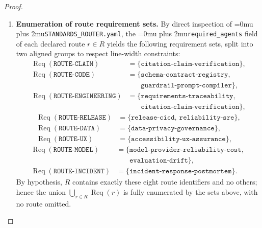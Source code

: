 \documentclass[12pt]{article}
\theoremstyle{definition}
\DeclareRobustCommand{\code}[1]{\begingroup\Urlmuskip=0mu plus 2mu\relax\nolinkurl{#1}\endgroup}
\begin{document}
\begin{proof}
\begin{enumerate}
      \item \textbf{Enumeration of route requirement sets.}
      By direct inspection of \code{STANDARDS\_ROUTER.yaml}, the
      \code{required\_agents} field of each declared route $r \in R$
      yields the following requirement sets, split into two aligned
      groups to respect line-width constraints:
      \begin{align*}
            \operatorname{Req}(\texttt{ROUTE-CLAIM})
                  &= \{\texttt{citation-claim-verification}\}, \\
            \operatorname{Req}(\texttt{ROUTE-CODE})
                  &= \{\texttt{schema-contract-registry},\ \\
                  &\phantom{{}=\{{}}\texttt{guardrail-prompt-compiler}\}, \\
            \operatorname{Req}(\texttt{ROUTE-ENGINEERING})
                  &= \{\texttt{requirements-traceability},\ \\
                  &\phantom{{}=\{{}}\texttt{citation-claim-verification}\},
      \end{align*}
      \begin{align*}
            \operatorname{Req}(\texttt{ROUTE-RELEASE})
                  &= \{\texttt{release-cicd},\ \texttt{reliability-sre}\}, \\
            \operatorname{Req}(\texttt{ROUTE-DATA})
                  &= \{\texttt{data-privacy-governance}\}, \\
            \operatorname{Req}(\texttt{ROUTE-UX})
                  &= \{\texttt{accessibility-ux-assurance}\},
      \end{align*}
      \begin{align*}
            \operatorname{Req}(\texttt{ROUTE-MODEL})
                  &= \{\texttt{model-provider-reliability-cost},\ \\
                  &\phantom{{}=\{{}}\texttt{evaluation-drift}\}, \\
            \operatorname{Req}(\texttt{ROUTE-INCIDENT})
                  &= \{\texttt{incident-response-postmortem}\}.
      \end{align*}
      By hypothesis, $R$ contains exactly these eight route
      identifiers and no others; hence the union
      $\bigcup_{r \in R} \operatorname{Req}(r)$ is fully enumerated
      by the sets above, with no route omitted.


\end{enumerate}
\end{proof}
\end{document}

